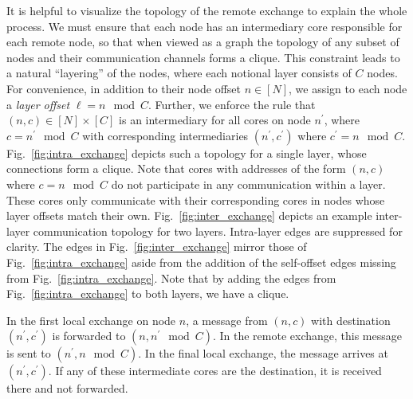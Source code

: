 \documentclass[10]{report}
\begin{document}
It is helpful to visualize the topology of the remote exchange to explain the whole process. 
We must ensure that each node has an intermediary core responsible for each remote node, so that when viewed as a graph the topology of any subset of nodes and their communication channels forms a clique. 
This constraint leads to a natural ``layering'' of the nodes, where each notional layer consists of $C$ nodes. 
For convenience, in addition to their node offset $n \in [N]$, we assign to each node a \emph{layer offset} $\ell = n \mod C$.
Further, we enforce the rule that $(n,c) \in [N] \times [C]$ is an intermediary for all cores on node $n^\prime$, where $c = n^\prime \mod C$ with corresponding intermediaries $(n^\prime, c^\prime)$ where $c^\prime = n \mod C$. 
Fig.~\ref{fig:intra_exchange} depicts such a topology for a single layer, whose connections form a clique. 
Note that cores with addresses of the form $(n, c)$ where $c = n \mod C$ do not participate in any communication within a layer. 
These cores only communicate with their corresponding cores in nodes whose layer offsets match their own. 
Fig.~\ref{fig:inter_exchange} depicts an example inter-layer communication topology  for two layers. 
Intra-layer edges are suppressed for clarity. 
The edges in Fig.~\ref{fig:inter_exchange} mirror those of Fig.~\ref{fig:intra_exchange} aside from the addition of the self-offset edges missing from Fig.~\ref{fig:intra_exchange}.
Note that by adding the edges from Fig.~\ref{fig:intra_exchange} to both layers, we have a clique.


%

In the first local exchange on node $n$, a message from $(n, c)$ with destination $(n^\prime, c^\prime)$ is forwarded to $(n, n^\prime \mod C)$.
In the remote exchange, this message is sent to $(n^\prime, n \mod C)$.
In the final local exchange, the message arrives at $(n^\prime, c^\prime)$.
If any of these intermediate cores are the destination, it is received there and not forwarded. 
\end{document}
